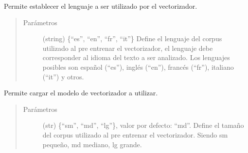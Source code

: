 \documentclass[letterpaper,10pt,openany,spanish]{sphinxmanual}
\begin{document}
\begin{fulllineitems}
\begin{fulllineitems}
\label{\detokenize{funciones/vectorizacion:vectorizacion.VectorizadorWord2Vec.establecer_lenguaje}}
Permite establecer el lenguaje a ser utilizado por el vectorizador.
\begin{quote}\begin{description}
\item[{Parámetros}] \leavevmode
{} \textendash{} (string) \{“es”, “en”, “fr”, “it”\} Define el 
lenguaje del corpus utilizado al pre entrenar el vectorizador, 
el lenguaje debe corresponder al idioma del texto a ser analizado. 
Los lenguajes posibles son español (“es”), inglés (“en”),  
francés (“fr”), italiano (“it”) y otros.

\end{description}\end{quote}

\end{fulllineitems}


\begin{fulllineitems}
\label{\detokenize{funciones/vectorizacion:vectorizacion.VectorizadorWord2Vec.iniciar_vectorizador}}
Permite cargar el modelo de vectorizador a utilizar.
\begin{quote}\begin{description}
\item[{Parámetros}] \leavevmode
{} \textendash{} (str) \{“sm”, “md”, “lg”\}, valor por defecto: “md”. 
Define el tamaño del corpus utilizado al pre entrenar 
el vectorizador. Siendo sm \sphinxhyphen{} pequeño, md \sphinxhyphen{} mediano, lg \sphinxhyphen{} grande.

\end{description}\end{quote}

\end{fulllineitems}



\end{fulllineitems}
\end{document}
